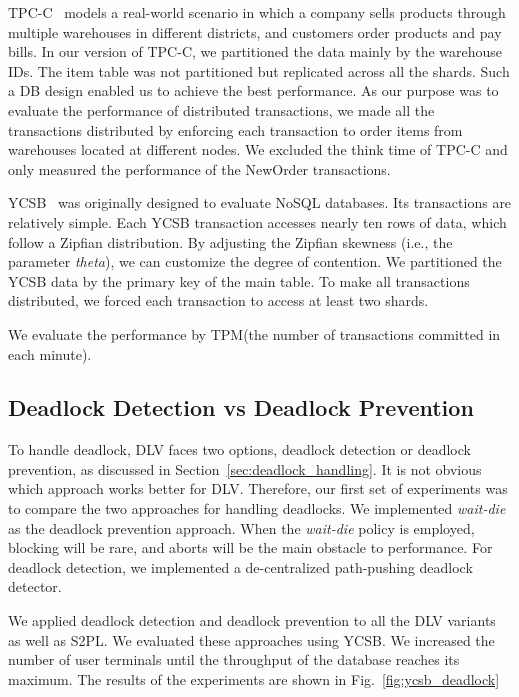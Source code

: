 \documentclass[conference]{IEEEtran}
\begin{document}
TPC-C~\cite{TPCC:conf/tpctc/NambiarWMTLCM11} models a real-world scenario in which a company sells products through multiple warehouses in different districts, and customers order products and pay bills.
In our version of TPC-C, we partitioned the data mainly by the warehouse IDs.
The item table was not partitioned but replicated across all the shards.
Such a DB design enabled us to achieve the best performance.
As our purpose was to evaluate the performance of distributed transactions,
we made all the transactions distributed by enforcing each transaction to order items from warehouses located at different nodes.
We excluded the think time of TPC-C and only measured the performance of the NewOrder transactions.


YCSB~\cite{YCSB:conf/cloud/CooperSTRS10} was originally designed to evaluate NoSQL databases.
Its transactions are relatively simple.
Each YCSB transaction accesses nearly ten rows of data, which follow a Zipfian distribution.
By adjusting the Zipfian skewness (i.e., the parameter \emph{theta}), we can customize the degree of contention.
We partitioned the YCSB data by the primary key of the main table.
To make all transactions distributed, we forced each transaction to access at least two shards.

We evaluate the performance by TPM(the number of transactions committed in each minute).


\subsection{Deadlock Detection vs Deadlock Prevention}

To handle deadlock, DLV faces two options, deadlock detection or deadlock prevention, as discussed in Section~\ref{sec:deadlock_handling}.
It is not obvious which approach works better for DLV. 
Therefore, our first set of experiments was to compare the two approaches for handling deadlocks.
We implemented \emph{wait-die} as the deadlock prevention approach.
When the \emph{wait-die} policy is employed, blocking will be rare, and aborts will be the main obstacle to performance.
For deadlock detection, we implemented a de-centralized path-pushing deadlock detector\cite{Deadlock:journals/computer/Singhal89}.

We applied deadlock detection and deadlock prevention to all the DLV variants as well as S2PL. 
We evaluated these approaches using YCSB.
We increased the number of user terminals until the throughput of the database reaches its maximum.
The results of the experiments are shown in Fig.~\ref{fig:ycsb_deadlock} 
\end{document}
